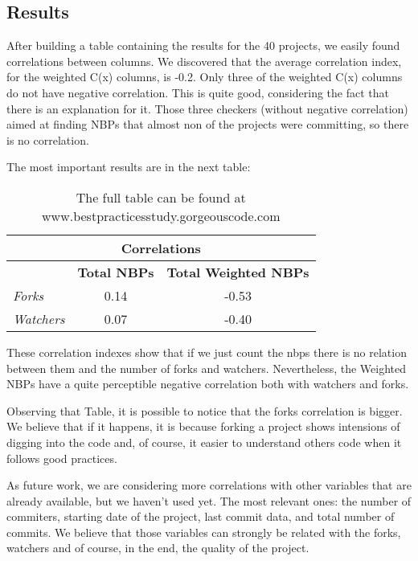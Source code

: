 \subsection{Results}\label{subsec:results}
After building a table containing the results for the 40 projects, we easily found correlations between columns.
We discovered that the average correlation index, for the weighted C(x) columns, is -0.2. Only three of the weighted C(x) columns do not have negative correlation. This is quite good, considering the fact that there is an explanation for it. 
Those three checkers (without negative correlation) aimed at finding  NBPs that almost non of the projects were committing, 
so there is no correlation.


The most important results are in the next table:
\begin{table}[H]
\begin{center}
{\scriptsize
\begin{threeparttable}
\begin{tabular}{|l||c|c|} \hline
\multicolumn{3}{|c|}{Correlations} \\ \hline
                       & \textbf{Total NBPs}  & \textbf{Total Weighted NBPs}  \\ \hline\hline
\emph{Forks         }  & 0.14                 & -0.53                       \\ \hline
\emph{Watchers      }  & 0.07                 & -0.40                       \\ \hline
\end{tabular}
\end{threeparttable}
}
\end{center}
\caption{ The full table can be found at www.bestpracticesstudy.gorgeouscode.com}
\end{table}

These correlation indexes show that if we just count the nbps there is no relation between them and the number of forks and watchers. Nevertheless, the Weighted NBPs have a quite perceptible negative correlation both with watchers and forks. 

Observing that Table, it is possible to notice that the forks correlation is bigger. 
We believe that if it happens, it is because forking a project shows intensions of digging into the code and, 
of course, it easier to understand others code when it follows good practices.

As future work, we are considering more correlations with other variables that are already available, but we haven't used yet. The most relevant ones: the number of commiters, starting date of the project, last commit data, and total number of commits. We believe that those variables can strongly be related with the forks, watchers and of course, in the end, the quality of the project.

